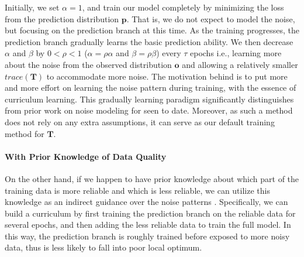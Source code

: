 Initially, we set $\alpha=1$, and train our model  completely by minimizing the loss from the prediction distribution $\mathbf{p}$. That is, we do not expect to model the noise,  but focusing  on the prediction branch at this time. As the training progresses, the prediction branch gradually learns the basic prediction ability. We then decrease $\alpha$ and  $\beta$ by $0<\rho<1$ ($\alpha=\rho\alpha$ and $\beta=\rho\beta$) every $\tau$ epochs i.e., learning more about the noise from the observed distribution $\mathbf{o}$ and allowing a relatively smaller $trace(\mathbf{T})$ to accommodate more noise.
The motivation behind is to put more and more effort on learning the noise pattern during training, 
with the essence of curriculum learning.
This gradually learning paradigm significantly distinguishes from prior work on noise modeling for \DS seen to date. 
Moreover, as such a method does not rely on any extra assumptions,
it can serve as our default training method for $\mathbf{T}$.

\paragraph{With Prior Knowledge of Data Quality}
On the other hand, if we happen to have prior knowledge about which part of the training data is more reliable and which is less reliable, we can utilize this knowledge as an indirect guidance over the noise patterns . Specifically, we can build a curriculum by first training the prediction branch on the reliable data for several epochs, and then adding the less reliable data to train the full model. In this way, the prediction branch is roughly trained before exposed to more noisy data, thus is less likely to fall into poor local optimum.

